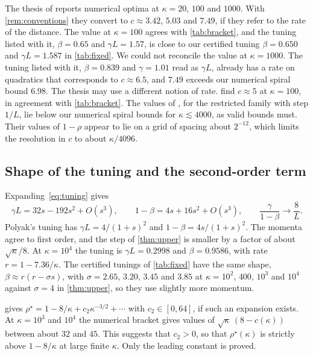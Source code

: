 \documentclass[11pt, a4paper]{article}
\theoremstyle{definition}
\begin{document}
The thesis of \citet[Table~10.1]{goujaud2024thesis} reports numerical optima at $\kappa=20$, $100$ and $1000$. With
\cref{rem:conventions} they convert to $c\approx3.42$, $5.03$ and $7.49$, if they refer to the rate of the distance. The
value at $\kappa=100$ agrees with \cref{tab:bracket}, and the tuning listed with it, $\beta=0.65$ and $\gamma L=1.57$,
is close to our certified tuning $\beta=0.650$ and $\gamma L=1.587$ in \cref{tab:fixed}. We could not reconcile the
value at $\kappa=1000$. The tuning listed with it, $\beta=0.839$ and $\gamma=1.01$ read as $\gamma L$, already has a
rate on quadratics that corresponds to $c\approx6.5$, and $7.49$ exceeds our numerical spiral bound $6.98$. The
thesis may use a different notion of rate.  find $c\approx5$ at $\kappa=100$, in agreement with
\cref{tab:bracket}. The values of \citet[Fig.~8]{lessard2016analysis}, for the restricted family with step $1/L$, lie
below our numerical spiral bounds for $\kappa\lesssim4000$, as valid bounds must. Their values of $1-\rho$ appear to lie
on a grid of spacing about $2^{-12}$, which limits the resolution in $c$ to about $\kappa/4096$.

\subsection{Shape of the tuning and the second-order term}

Expanding~\eqref{eq:tuning} gives
\[
  \gamma L=32s-192s^2+O(s^3),\qquad 1-\beta=4s+16s^2+O(s^3),\qquad\frac{\gamma}{1-\beta}\to\frac8L.
\]
Polyak's tuning has $\gamma L=4/(1+s)^2$ and $1-\beta=4s/(1+s)^2$. The momenta agree to first order, and the step of
\cref{thm:upper} is smaller by a factor of about $\sqrt\kappa/8$. At $\kappa=10^4$ the tuning is $\gamma L=0.2998$ and $\beta=0.9586$,
with rate $r=1-7.36/\kappa$. The certified tunings of \cref{tab:fixed} have the same shape,
$\beta\approx r(r-\sigma s)$, with $\sigma=2.65$, $3.20$, $3.45$ and $3.85$ at $\kappa=10^2$, $400$, $10^3$ and $10^4$
against $\sigma=4$ in \cref{thm:upper}, so they use slightly more momentum.

 gives $\rho^\star=1-8/\kappa+c_2\kappa^{-3/2}+\cdots$ with $c_2\in[0,64]$, if such an expansion
exists. At $\kappa=10^3$ and $10^4$ the numerical bracket gives values of $\sqrt\kappa\,(8-c(\kappa))$ between about $32$ and
$45$. This suggests that $c_2>0$, so that $\rho^\star(\kappa)$ is strictly above $1-8/\kappa$ at large finite
$\kappa$. Only the leading constant is proved.
\end{document}
